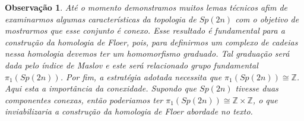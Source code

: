 \documentclass[12pt]{book}
\newtheorem{observacao}[teorema]{Observação}
\newcommand{\grupofundamental}[1]{\pi_{1}(#1)}
\newcommand{\gruposimpletico}[1]{Sp(#1)}
\newcommand{\inteiros}{\mathbb{Z}}
\begin{document}
	\begin{observacao}\label{observacao_conexidade_grupo_simpletico}
		Até o momento demonstramos muitos lemas técnicos afim de examinarmos algumas características da topologia de $\gruposimpletico{2n}$ com o objetivo de mostrarmos que esse conjunto é conexo. Esse resultado é fundamental para a construção da homologia de Floer, pois, para definirmos um complexo de cadeias nessa homologia devemos ter um homomorfismo graduado. Tal graduação será dada pelo índice de Maslov e este será relacionado grupo fundamental $\grupofundamental{\gruposimpletico{2n}}$. Por fim, a estratégia adotada necessita que $\grupofundamental{\gruposimpletico{2n}} \cong \inteiros$. Aqui esta a importância da conexidade. Supondo que $\gruposimpletico{2n}$ tivesse duas componentes conexas, então poderiamos ter $\grupofundamental{\gruposimpletico{2n}} \cong \inteiros \times \inteiros$, o que inviabilizaria a construção da homologia de Floer abordade no texto.
	\end{observacao}
\end{document}
